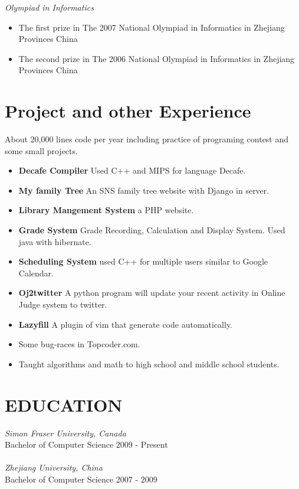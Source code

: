 \documentclass[line,margin]{res}
\begin{document}
\begin{resume}
\begin{itemize}
\end{itemize}
{\sl Olympiad in Informatics}
\begin{itemize}
\item The first  prize in The 2007 National Olympiad in Informatics in Zhejiang Provinces China 
\item The second prize in The 2006 National Olympiad in Informatics in Zhejiang Provinces China
\end{itemize}


\section{Project and other Experience}
About 20,000 lines code per year including practice of programing contest and
some small projects.
\begin{itemize}
\item {\bf Decafe Compiler} Used C++ and MIPS for language Decafe. 
\item {\bf My family Tree} An SNS family tree website with Django in server.
\item {\bf Library Mangement System} a PHP website.
\item {\bf Grade System} Grade Recording, Calculation and Display System. Used java with hibernate.
\item {\bf Scheduling System} used C++ for multiple users similar to Google Calendar.
\item {\bf Oj2twitter} A python program will update your recent activity in Online Judge system to twitter.
\item {\bf Lazyfill} A plugin of vim that generate code automatically.
\item Some bug-races in Topcoder.com.
\item Taught algorithms and math to high school and middle school students.
\end{itemize}
\section{EDUCATION}
				{\sl Simon Fraser University, Canada}\\
				Bachelor of Computer Science 
				2009 - Present \\
				\\
				{\sl Zhejiang University, China} \\
				Bachelor of Computer Science	
				2007 - 2009  

\end{resume}
\end{document}
